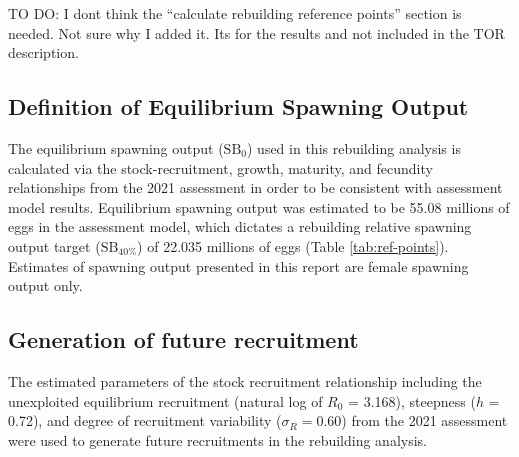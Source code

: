 \documentclass[11pt,
  english,
  a4paper,
]{article}
\begin{document}

TO DO: I dont think the ``calculate rebuilding reference points'' section is needed. Not sure why I added it. Its for the results and not included in the TOR description.

\leavevmode\tagmcend\tagstructend\par


\hypertarget{definition-of-equilibrium-spawning-output}{%
\subsection{Definition of Equilibrium Spawning Output}\label{definition-of-equilibrium-spawning-output}}

\leavevmode\tagmcend\tagstructend


The equilibrium spawning output ({\(\text{SB}_0\)\leavevmode\tagmcend\tagstructend}) used in this rebuilding analysis is calculated via the stock-recruitment, growth, maturity, and fecundity relationships from the 2021 assessment in order to be consistent with assessment model results. Equilibrium spawning output was estimated to be 55.08 millions of eggs in the assessment model, which dictates a rebuilding relative spawning output target ({\(\text{SB}_{40\%}\)\leavevmode\tagmcend\tagstructend}) of 22.035 millions of eggs (Table \ref{tab:ref-points}). Estimates of spawning output presented in this report are female spawning output only.

\leavevmode\tagmcend\tagstructend\par


\hypertarget{generation-of-future-recruitment}{%
\subsection{Generation of future recruitment}\label{generation-of-future-recruitment}}

\leavevmode\tagmcend\tagstructend


The estimated parameters of the stock recruitment relationship including the unexploited equilibrium recruitment (natural log of {\(R_0\)\leavevmode\tagmcend\tagstructend} = 3.168), steepness ({\(h\)\leavevmode\tagmcend\tagstructend} = 0.72), and degree of recruitment variability ({\(\sigma_R = 0.60\)\leavevmode\tagmcend\tagstructend}) from the 2021 assessment were used to generate future recruitments in the rebuilding analysis.
\end{document}
